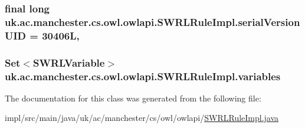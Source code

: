 \hypertarget{classuk_1_1ac_1_1manchester_1_1cs_1_1owl_1_1owlapi_1_1_s_w_r_l_rule_impl_a67e806f1a1990a78863b3354a0afebfe}{
\subsubsection[{serial\-Version\-U\-I\-D}]{\setlength{\rightskip}{0pt plus 5cm}final long uk.\-ac.\-manchester.\-cs.\-owl.\-owlapi.\-S\-W\-R\-L\-Rule\-Impl.\-serial\-Version\-U\-I\-D = 30406\-L\hspace{0.3cm}{\ttfamily [static]}, {\ttfamily [private]}}}\label{classuk_1_1ac_1_1manchester_1_1cs_1_1owl_1_1owlapi_1_1_s_w_r_l_rule_impl_a67e806f1a1990a78863b3354a0afebfe}
\hypertarget{classuk_1_1ac_1_1manchester_1_1cs_1_1owl_1_1owlapi_1_1_s_w_r_l_rule_impl_ad25d611003fdc915f90fe5befc1a74ad}{
\subsubsection[{variables}]{\setlength{\rightskip}{0pt plus 5cm}Set$<${\bf S\-W\-R\-L\-Variable}$>$ uk.\-ac.\-manchester.\-cs.\-owl.\-owlapi.\-S\-W\-R\-L\-Rule\-Impl.\-variables\hspace{0.3cm}{\ttfamily [private]}}}\label{classuk_1_1ac_1_1manchester_1_1cs_1_1owl_1_1owlapi_1_1_s_w_r_l_rule_impl_ad25d611003fdc915f90fe5befc1a74ad}


The documentation for this class was generated from the following file\-:\begin{DoxyCompactItemize}
\item 
impl/src/main/java/uk/ac/manchester/cs/owl/owlapi/\hyperlink{_s_w_r_l_rule_impl_8java}{S\-W\-R\-L\-Rule\-Impl.\-java}\end{DoxyCompactItemize}
